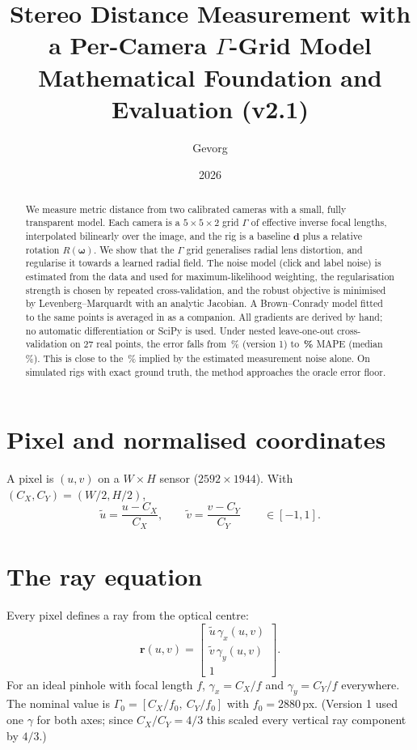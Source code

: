 \documentclass[11pt,a4paper]{article}
\title{\textbf{Stereo Distance Measurement with a Per-Camera $\Gamma$-Grid Model}\\[4pt]
\large Mathematical Foundation and Evaluation (v2.1)}
\author{Gevorg}
\date{2026}
\newcommand{\vr}{\mathbf{r}}
\newcommand{\vd}{\mathbf{d}}
\newcommand{\G}{\Gamma}
\begin{document}
\maketitle

\begin{abstract}
We measure metric distance from two calibrated cameras with a small, fully transparent
model. Each camera is a $5\times5\times2$ grid $\G$ of effective inverse focal lengths,
interpolated bilinearly over the image, and the rig is a baseline $\vd$ plus a relative
rotation $R(\bm\omega)$. We show that the $\G$ grid generalises radial lens distortion,
and regularise it towards a learned radial field. The noise model (click and label noise)
is estimated from the data and used for maximum-likelihood weighting, the regularisation
strength is chosen by repeated cross-validation, and the robust objective is minimised by
Levenberg--Marquardt with an analytic Jacobian. A Brown--Conrady model fitted to the same
points is averaged in as a companion. All gradients are derived by hand; no automatic
differentiation or SciPy is used. Under nested leave-one-out cross-validation on 27 real
points, the error falls from \MapeLegacy\,\% (version 1) to \textbf{\MapeVOne\,\%} MAPE
(median \MedVOne\,\%). This is close to the \BudgetTotal\,\% implied by the estimated
measurement noise alone. On simulated rigs with exact ground truth, the method approaches
the oracle error floor.
\end{abstract}

\tableofcontents
\newpage

\section{Pixel and normalised coordinates}
A pixel is $(u,v)$ on a $W\times H$ sensor ($2592\times1944$). With $(C_X,C_Y)=(W/2,H/2)$,
\begin{equation}
\tilde u = \frac{u-C_X}{C_X},\qquad \tilde v=\frac{v-C_Y}{C_Y}\qquad\in[-1,1].
\end{equation}

\section{The ray equation}
Every pixel defines a ray from the optical centre:
\begin{equation}\label{eq:ray}
\vr(u,v)=\begin{bmatrix}\tilde u\,\gamma_x(u,v)\\ \tilde v\,\gamma_y(u,v)\\ 1\end{bmatrix}.
\end{equation}
For an ideal pinhole with focal length $f$, $\gamma_x=C_X/f$ and $\gamma_y=C_Y/f$ everywhere. The nominal
value is $\G_0=[C_X/f_0,\ C_Y/f_0]$ with $f_0=2880$\,px. (Version 1 used one $\gamma$ for both axes; since
$C_X/C_Y=4/3$ this scaled every vertical ray component by $4/3$.)
\end{document}
